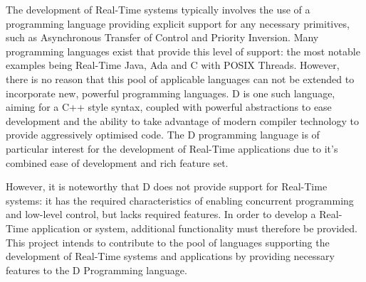 The development of Real-Time systems typically involves the use of a programming 
language providing explicit support for any necessary primitives, such as 
Asynchronous Transfer of Control and Priority Inversion. 
Many programming languages exist that provide this level of support: the most 
notable examples being Real-Time Java, Ada and C with POSIX Threads. However, 
there is no reason that this pool of applicable languages can not be extended to 
incorporate new, powerful programming languages. 
D is one such language, aiming for a C++ style syntax, coupled with powerful 
abstractions to ease development and the ability to take advantage of modern 
compiler technology to provide aggressively optimised code.
The D programming language is of particular interest for 
the development of Real-Time applications due to it's combined ease of development
and rich feature set. 
\par\bigskip\noindent
However, it is noteworthy that D does not provide support for Real-Time systems: 
it has the required characteristics of enabling concurrent programming and low-level 
control, but lacks required features. 
In order to develop a Real-Time application or system, additional functionality 
must therefore be provided.
This project intends to contribute to the pool of languages supporting the development 
of Real-Time systems and applications by providing necessary features 
to the D Programming language. 
